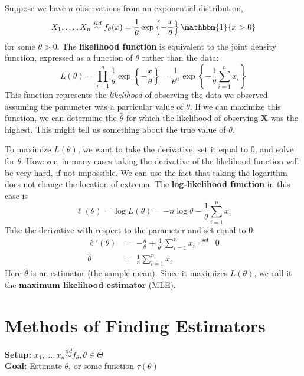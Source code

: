 \documentclass[11pt,fleqn]{book} %
\newlength\tindent
\renewcommand{\indent}{\hspace*{\tindent}}
\begin{document}
	\begin{example}
		Suppose we have $n$ observations from an exponential distribution,
		$$
			X_1, \dots, X_n \stackrel{iid}{\sim} f_\theta(x)=\frac{1}{\theta}\exp\left\{-\frac{x}{\theta}\right\}\mathbbm{1}\{x>0\}
		$$
		for some $\theta > 0$. The \textbf{likelihood function} is equivalent to the joint density function, expressed as a function of $\theta$ rather than the data:
		$$
			L(\theta) = \prod_{i=1}^n \frac{1}{\theta}\exp\left\{-\frac{x}{\theta}\right\} = \frac{1}{\theta^n}\exp\left\{-\frac{1}{\theta}\sum_{i=1}^n x_i\right\}
		$$
		This function represents the \emph{likelihood} of observing the data we observed assuming the parameter was a particular value of $\theta$. If we can maximize this function, we can determine the $\hat{\theta}$ for which the likelihood of observing $\bm{X}$ was the highest. This might tell us something about the true value of $\theta$.

		\indent To maximize $L(\theta)$, we want to take the derivative, set it equal to 0, and solve for $\theta$. However, in many cases taking the derivative of the likelihood function will be very hard, if not impossible. We can use the fact that taking the logarithm does not change the location of extrema. The \textbf{log-likelihood function} in this case is
		\begin{equation*}
			\ell(\theta) = \log L(\theta) = -n \log \theta - \frac{1}{\theta} \sum_{i=1}^n x_i
		\end{equation*}
		Take the derivative with respect to the parameter and set equal to 0:
		\begin{eqnarray*}
			\ell'(\theta) &=& -\frac{n}{\theta} + \frac{1}{\theta^2} \sum_{i=1}^n x_i \enspace \stackrel{\textrm{set}}{=} \enspace 0\\
			\hat{\theta} &=& \frac{1}{n} \sum_{i=1}^n x_i
		\end{eqnarray*}
		Here $\hat{\theta}$ is an estimator (the sample mean). Since it maximizes $L(\theta)$, we call it the \textbf{maximum likelihood estimator} (MLE).
	\end{example}

\section{Methods of Finding Estimators}

 \textbf{Setup:} $x_1, \dots, x_n \overset{iid}{\sim} f_\theta, \theta \in \Theta$  \\
 \textbf{Goal:} Estimate $\theta$, or some function $\tau(\theta)$\\
\end{document}
